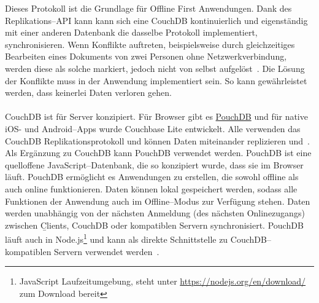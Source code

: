 Dieses Protokoll ist die Grundlage für Offline First Anwendungen.
Dank des Replikations--\gls{API} kann kann sich eine CouchDB kontinuierlich und eigenständig mit einer anderen Datenbank die dasselbe Protokoll implementiert, synchronisieren.
Wenn Konflikte auftreten, beispielsweise durch gleichzeitiges Bearbeiten eines Dokuments von zwei Personen ohne Netzwerkverbindung, werden diese als solche markiert, jedoch nicht von selbst aufgelöst~\cite{couch}. Die Lösung der Konflikte muss in der Anwendung implementiert sein.
So kann gewährleistet werden, dass keinerlei Daten verloren gehen.\\\\
CouchDB ist für Server konzipiert. Für Browser gibt es \hyperref[sub:pouch]{PouchDB} und für native iOS- und Android--\glspl{App} wurde Couchbase Lite entwickelt. Alle verwenden das CouchDB Replikationsprotokoll und können Daten miteinander replizieren und~\cite{couch}.
%
%
Als Ergänzung zu CouchDB kann PouchDB verwendet werden. PouchDB ist eine quelloffene JavaScript--Datenbank, die so konzipiert wurde, dass sie im Browser läuft.
PouchDB ermöglicht es Anwendungen zu erstellen, die sowohl offline als auch online funktionieren.
Daten können lokal gespeichert werden, sodass alle Funktionen der Anwendung auch im Offline--Modus zur Verfügung stehen.
Daten werden unabhängig von der nächsten Anmeldung (des nächsten Onlinezugangs) zwischen \b{Clients}, CouchDB oder kompatiblen Servern synchronisiert.
PouchDB läuft auch in Node.js\footnote{JavaScript Laufzeitumgebung, steht unter \url{https://nodejs.org/en/download/} zum Download bereit} und kann als direkte Schnittstelle zu CouchDB--kompatiblen Servern verwendet werden~\cite{pouch}.

